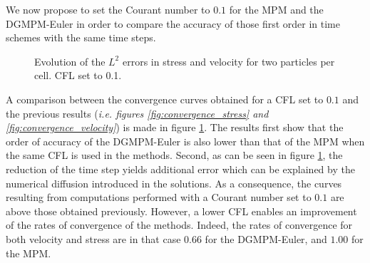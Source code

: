 We now propose to set the Courant number to $0.1$ for the MPM and the DGMPM-Euler in order to compare the accuracy of those first order in time schemes with the same time steps.
\begin{figure}[h!]
  \centering
  {\label{subfig:lowCFL_stress}}
  {\label{subfig:lowCFL_velo}}
  \caption{Evolution of the $L^2$ errors in stress and velocity for two particles per cell. CFL set to 0.1.}
  \label{fig:convergence_lowCFL}
\end{figure}
%   
A comparison between the convergence curves obtained for a CFL set to $0.1$ and the previous results (\textit{i.e. figures \ref{fig:convergence_stress} and \ref{fig:convergence_velocity}}) is made in figure \ref{fig:convergence_lowCFL}.
The results first show that the order of accuracy of the DGMPM-Euler is also lower than that of the MPM when the same CFL is used in the methods.
Second, as can be seen in figure \ref{fig:convergence_lowCFL}, the reduction of the time step yields additional error which can be explained by the numerical diffusion introduced in the solutions.
As a consequence, the curves resulting from computations performed with a Courant number set to $0.1$ are above those obtained previously.
However, a lower CFL enables an improvement of the rates of convergence of the methods. Indeed, the rates of convergence for both velocity and stress are in that case $0.66$ for the DGMPM-Euler, and $1.00$ for the MPM.

